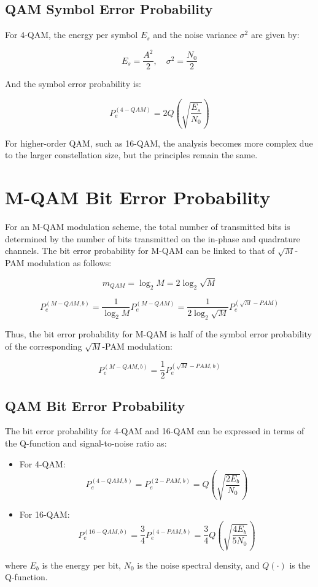 \subsection*{QAM Symbol Error Probability}

For 4-QAM, the energy per symbol \( E_s \) and the noise variance \( \sigma^2 \) are given by:

\[
E_s = \frac{A^2}{2}, \quad \sigma^2 = \frac{N_0}{2}
\]

And the symbol error probability is:

\[
P_e^{(4-QAM)} = 2Q\left(\sqrt{\frac{E_s}{N_0}}\right)
\]

For higher-order QAM, such as 16-QAM, the analysis becomes more complex due to the larger constellation size, but the principles remain the same.


\section*{M-QAM Bit Error Probability}

For an M-QAM modulation scheme, the total number of transmitted bits is determined by the number of bits transmitted on the in-phase and quadrature channels. The bit error probability for M-QAM can be linked to that of \( \sqrt{M} \)-PAM modulation as follows:

\[
m_{QAM} = \log_2 M = 2 \log_2 \sqrt{M}
\]

\[
P_{e}^{(M-QAM,b)} = \frac{1}{\log_2 M} P_{e}^{(M-QAM)} = \frac{1}{2 \log_2 \sqrt{M}} P_{e}^{(\sqrt{M}-PAM)}
\]

Thus, the bit error probability for M-QAM is half of the symbol error probability of the corresponding \( \sqrt{M} \)-PAM modulation:

\[
P_{e}^{(M-QAM,b)} = \frac{1}{2} P_{e}^{(\sqrt{M}-PAM,b)}
\]

\subsection*{QAM Bit Error Probability}

The bit error probability for 4-QAM and 16-QAM can be expressed in terms of the Q-function and signal-to-noise ratio as:

\begin{itemize}
    \item For 4-QAM:
    \[
    P_{e}^{(4-QAM,b)} = P_{e}^{(2-PAM,b)} = Q\left( \sqrt{\frac{2E_b}{N_0}} \right)
    \]

    \item For 16-QAM:
    \[
    P_{e}^{(16-QAM,b)} = \frac{3}{4} P_{e}^{(4-PAM,b)} = \frac{3}{4} Q\left( \sqrt{\frac{4E_b}{5N_0}} \right)
    \]
\end{itemize}

where \( E_b \) is the energy per bit, \( N_0 \) is the noise spectral density, and \( Q(\cdot) \) is the Q-function.

